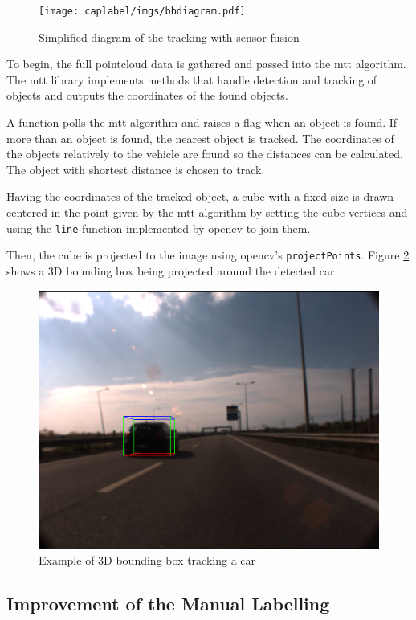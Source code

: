 \begin{figure}[htp]
	
	\centering
	\texttt{[image: caplabel/imgs/bbdiagram.pdf]}
	
	\caption{Simplified diagram of the tracking with sensor fusion}
	\label{fig:bbdiagram}
	
\end{figure}

To begin, the full pointcloud data is gathered and passed into the \gls{mtt} algorithm. The \gls{mtt} library implements methods that handle detection and tracking of objects and outputs the coordinates of the found objects. 

A function polls the \gls{mtt} algorithm and raises a flag when an object is found. If more than an object is found, the nearest object is tracked. The coordinates of the objects relatively to the vehicle are found so the distances can be calculated. The object with shortest distance is chosen to track.

Having the coordinates of the tracked object, a cube with a fixed size is drawn centered in the point given by the \gls{mtt} algorithm by setting the cube vertices and using the \texttt{line} function implemented by \gls{opencv} to join them.

Then, the cube is projected to the image using \gls{opencv}'s \texttt{projectPoints}. Figure \ref{fig:cube} shows a 3D bounding box being projected around the detected car.

\begin{figure}[htp]
	
	\centering
	\includegraphics[width=.6\textwidth]{caplabel/imgs/3dcube.png}
	
	\caption{Example of 3D bounding box tracking a car}
	\label{fig:cube}
	
\end{figure}

\subsection{Improvement of the Manual Labelling}

